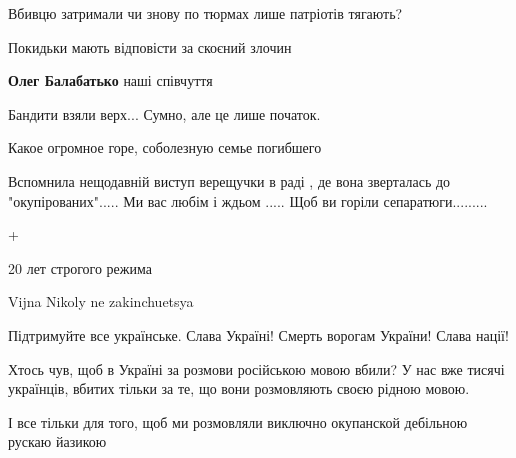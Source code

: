 \begin{itemize}
Вбивцю затримали чи знову по тюрмах лише патріотів тягають?

Покидьки мають відповісти за скоєний злочин

\textbf{Олег Балабатько} наші співчуття

Бандити взяли верх... Сумно, але це лише початок.

Какое огромное горе, соболезную семье погибшего


Вспомнила нещодавній виступ верещучки в раді , де вона зверталась до
"окупірованих"..... Ми вас любім і ждьом ..... Щоб ви горіли
сепаратюги.........

+

20 лет строгого режима

Vijna Nikoly ne zakinchuetsya

Підтримуйте все українське. Слава Україні! Смерть ворогам України! Слава нації!


Хтось чув, щоб в Україні за розмови російською мовою вбили? У нас вже тисячі
українців, вбитих тільки за те, що вони розмовляють своєю рідною мовою.

І все тільки для того, щоб ми розмовляли виключно окупанской дебільною рускаю
йазикою
\end{itemize} %
